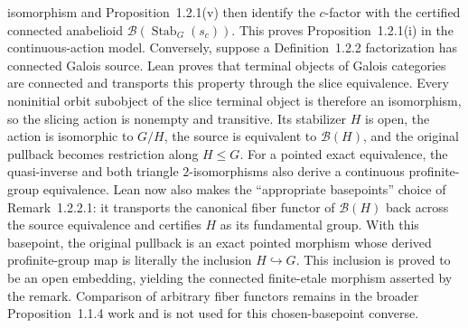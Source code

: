 \begin{definition}
  isomorphism and Proposition~1.2.1(v) then identify the $c$-factor with the
  certified connected anabelioid
  $\mathcal B(\operatorname{Stab}_G(s_c))$.  This proves
  Proposition~1.2.1(i) in the continuous-action model.  Conversely, suppose a
  Definition~1.2.2 factorization has connected Galois source.  Lean proves that
  terminal objects of Galois categories are connected and transports this
  property through the slice equivalence.  Every noninitial orbit subobject of
  the slice terminal object is therefore an isomorphism, so the slicing action
  is nonempty and transitive.  Its stabilizer $H$ is open, the action is
  isomorphic to $G/H$, the source is equivalent to $\mathcal B(H)$, and the
  original pullback becomes restriction along $H\leq G$.  For a pointed exact
  equivalence, the quasi-inverse and both triangle $2$-isomorphisms also derive
  a continuous profinite-group equivalence.  Lean now also makes the
  ``appropriate basepoints'' choice of Remark~1.2.2.1: it transports the
  canonical fiber functor of $\mathcal B(H)$ back across the source
  equivalence and certifies $H$ as its fundamental group.  With this basepoint,
  the original pullback is an exact pointed morphism whose derived
  profinite-group map is literally the inclusion $H\hookrightarrow G$.  This
  inclusion is proved to be an open embedding, yielding the connected
  finite-etale morphism asserted by the remark.  Comparison of arbitrary
  fiber functors remains in the broader Proposition~1.1.4 work and is not used
  for this chosen-basepoint converse.

\end{definition}
